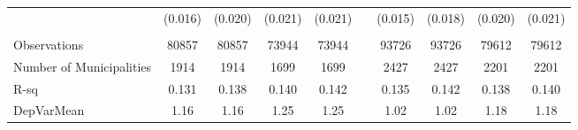\begin{tabular}{lccccccccc}
      & (0.016) & (0.020) & (0.021) & (0.021) &       & (0.015) & (0.018) & (0.020) & (0.021) \\
      &       &       &       &       &       &       &       &       &  \\
\midrule
Observations & 80857 & 80857 & 73944 & 73944 &       & 93726 & 93726 & 79612 & 79612 \\
Number of Municipalities & 1914  & 1914  & 1699  & 1699  &       & 2427  & 2427  & 2201  & 2201 \\
R-sq  & 0.131 & 0.138 & 0.140 & 0.142 &       & 0.135 & 0.142 & 0.138 & 0.140 \\
DepVarMean & 1.16  & 1.16  & 1.25  & 1.25  &       & 1.02  & 1.02  & 1.18  & 1.18 \\
\bottomrule
\bottomrule
\end{tabular}%
